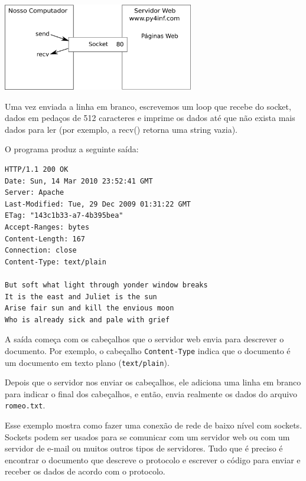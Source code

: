 \beforefig
\centerline{\includegraphics[height=1.50in]{figs2/socket.eps}}
\afterfig

Uma vez enviada a linha em branco, escrevemos um loop que recebe do
socket, dados em pedaços de 512 caracteres e imprime os dados até que não
exista mais dados para ler (por exemplo, a recv() retorna uma string vazia).

O programa produz a seguinte saída:

\beforeverb
\begin{verbatim}
HTTP/1.1 200 OK
Date: Sun, 14 Mar 2010 23:52:41 GMT
Server: Apache
Last-Modified: Tue, 29 Dec 2009 01:31:22 GMT
ETag: "143c1b33-a7-4b395bea"
Accept-Ranges: bytes
Content-Length: 167
Connection: close
Content-Type: text/plain

But soft what light through yonder window breaks
It is the east and Juliet is the sun
Arise fair sun and kill the envious moon
Who is already sick and pale with grief
\end{verbatim}
\afterverb

A saída começa com os cabeçalhos que o servidor web envia para descrever o
documento. Por exemplo, o cabeçalho {\tt Content-Type} indica que o documento
é um documento em texto plano ({\tt text/plain}).

Depois que o servidor nos enviar os cabeçalhos, ele adiciona uma linha em branco
para indicar o final dos cabeçalhos, e então, envia realmente os dados do
arquivo {\tt romeo.txt}.

Esse exemplo mostra como fazer uma conexão de rede de baixo nível com sockets.
Sockets podem ser usados para se comunicar com um servidor web ou com um
servidor de e-mail ou muitos outros tipos de servidores. Tudo que é preciso é
encontrar o documento que descreve o protocolo e escrever o código para enviar
e receber os dados de acordo com o protocolo.

